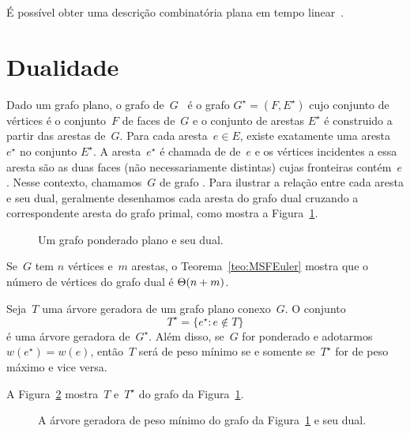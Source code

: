 É possível obter uma descrição combinatória plana em tempo linear~.

\section{Dualidade}
\label{sec:dualidade}


Dado um grafo plano, o grafo  de~$G$~\cite{planarTheoryAlgorith} é o grafo $G^\star = (F,E^\star)$ cujo conjunto de vértices é o conjunto~$F$ de faces de~$G$ e o conjunto de arestas $E^\star$ é construido a partir das arestas de~$G$.
Para cada aresta~$e\in E$, existe exatamente uma aresta~$e^\star$ no conjunto $E^\star$.
A aresta~$e^\star$ é chamada de  de~$e$ e os vértices incidentes a essa aresta são as duas faces (não necessariamente distintas) cujas fronteiras contém~$e$.
Nesse contexto, chamamos~$G$ de grafo .
Para ilustrar a relação entre cada aresta e seu dual, geralmente desenhamos cada aresta do grafo dual cruzando a correspondente aresta do grafo primal, como mostra a Figura~\ref{fig:MSF-basico-1}.

\begin{figure}[htb]
\scalebox{1.5}{
\centering

}
\caption{Um grafo ponderado plano e seu dual.}
\label{fig:MSF-basico-1}
\end{figure}


Se~$G$ tem $n$ vértices e~$m$ arestas, o Teorema~\ref{teo:MSFEuler} mostra que o número de vértices do grafo dual é $\Theta(n+m)$.

\begin{theorem}
\label{teo:MSFdual}
Seja~$T$ uma árvore geradora de um grafo plano conexo~$G$. O conjunto
$$
T^\star = \{e^\star:e\notin T\}
$$
é uma árvore geradora de~$G^\star$.
Além disso, se~$G$ for ponderado e adotarmos $w(e^\star) = w(e)$, então~$T$ será de peso mínimo se e somente se~$T^\star$ for de peso máximo e vice versa.
\end{theorem}

A Figura~\ref{fig:MSF-figura-2} mostra~$T$ e~$T^\star$ do grafo da Figura~\ref{fig:MSF-basico-1}.


\begin{figure}[htb]
\scalebox{1.5}{
\centering

}
\caption{A árvore geradora de peso mínimo do grafo da Figura~\ref{fig:MSF-basico-1} e seu dual.}
\label{fig:MSF-figura-2}
\end{figure}



